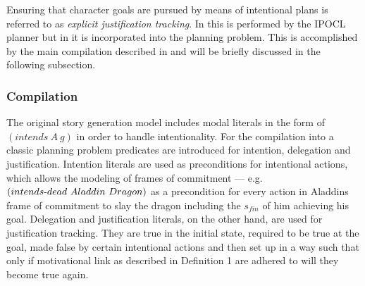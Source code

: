 Ensuring that character goals are pursued by means of intentional plans is referred to as \emph{explicit justification tracking}. In \cite{Riedl10} this is performed by the IPOCL planner but in \cite{Haslum14} it is incorporated into the planning problem. This is accomplished by the main compilation described in \cite{Haslum14} and will be briefly discussed in the following subsection.

\subsubsection{Compilation}
The original story generation model includes modal literals in the form of $(intends\ A\ g)$ in order to handle intentionality. For the compilation into a classic planning problem predicates are introduced for intention, delegation and justification. Intention literals are used as preconditions for intentional actions, which allows the modeling of frames of commitment --- e.g. $(intends\h dead\ Aladdin\ Dragon)$ as a precondition for every action in Aladdins frame of commitment to slay the dragon including the $s_{fin}$ of him achieving his goal. Delegation and justification literals, on the other hand, are used for justification tracking. They are true in the initial state, required to be true at the goal, made false by certain intentional actions and then set up in a way such that only if motivational link as described in Definition 1 are adhered to will they become true again.

